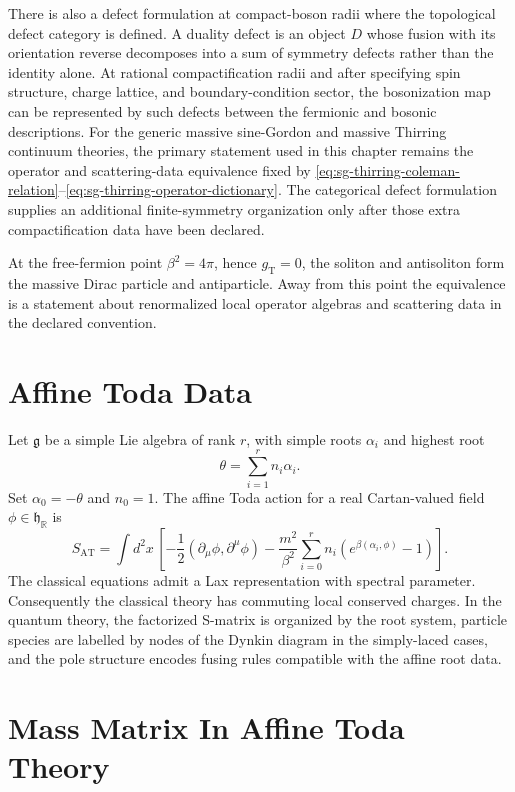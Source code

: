 There is also a defect formulation at compact-boson radii where the
topological defect category is defined.  A duality defect is an object \(D\)
whose fusion with its orientation reverse decomposes into a sum of symmetry
defects rather than the identity alone.  At rational compactification radii
and after specifying spin structure, charge lattice, and boundary-condition
sector, the bosonization map can be represented by such defects between the
fermionic and bosonic descriptions.  For the generic massive sine-Gordon and
massive Thirring continuum theories, the primary statement used in this
chapter remains the operator and scattering-data equivalence fixed by
\eqref{eq:sg-thirring-coleman-relation}--\eqref{eq:sg-thirring-operator-dictionary}.
The categorical defect formulation supplies an additional finite-symmetry
organization only after those extra compactification data have been declared.

At the free-fermion point \(\beta^2=4\pi\), hence \(g_{\mathrm{T}}=0\), the
soliton and antisoliton form the massive Dirac particle and antiparticle.
Away from this point the equivalence is a statement about renormalized local
operator algebras and scattering data in the declared convention.

\section{Affine Toda Data}

Let \(\mathfrak g\) be a simple Lie algebra of rank \(r\), with simple roots
\(\alpha_i\) and highest root
\[
  \theta=\sum_{i=1}^r n_i\alpha_i .
\]
Set \(\alpha_0=-\theta\) and \(n_0=1\).  The affine Toda action for a real
Cartan-valued field \(\phi\in\mathfrak h_\mathbb R\) is
\[
  S_{\mathrm{AT}}
  =
  \int d^2x\,
  \left[
  -\frac12(\partial_\mu\phi,\partial^\mu\phi)
  -\frac{m^2}{\beta^2}\sum_{i=0}^r n_i
  \left(e^{\beta(\alpha_i,\phi)}-1\right)
  \right].
\]
The classical equations admit a Lax representation with spectral parameter.
Consequently the classical theory has commuting local conserved charges.  In
the quantum theory, the factorized S-matrix is organized by the root system,
particle species are labelled by nodes of the Dynkin diagram in the
simply-laced cases, and the pole structure encodes fusing rules compatible
with the affine root data.

\section{Mass Matrix In Affine Toda Theory}

